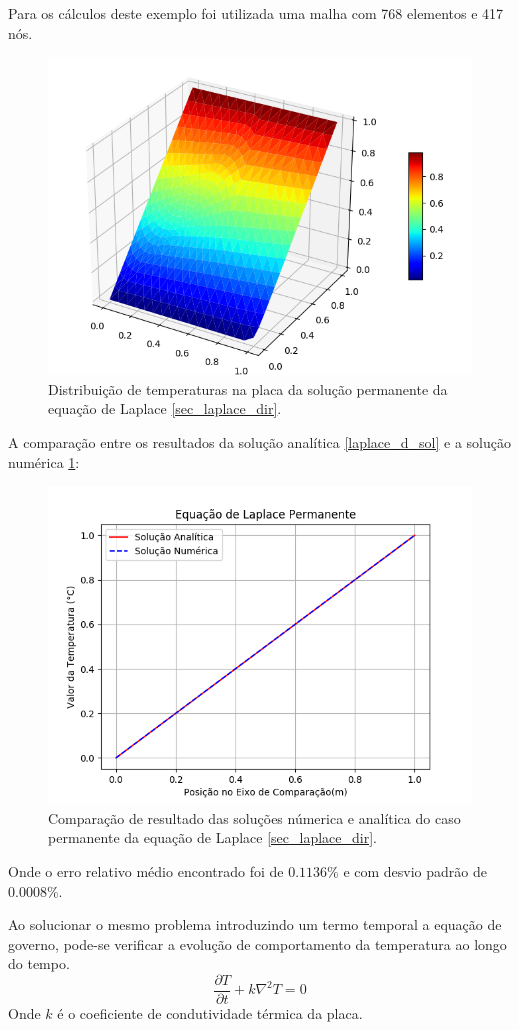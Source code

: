 Para os cálculos deste exemplo foi utilizada uma malha com 768 elementos e 417 nós.
\begin{figure}[H]
    \centering
    \includegraphics[width=.5\linewidth]{figures/laplace_dirichlet_permanent_3d.png}
    \caption{Distribuição de temperaturas na placa da solução permanente da equação de Laplace \ref{sec_laplace_dir}.}
    \label{laplace_d_3d}
\end{figure}

A comparação entre os resultados da solução analítica \ref{laplace_d_sol} e a solução numérica \ref{laplace_d_3d}:
\begin{figure}[H]
    \centering
    \includegraphics[width=.7\linewidth]{figures/laplace_dirichlet_permanent_comparison.png}
    \caption{Comparação de resultado das soluções númerica e analítica do caso permanente da equação de Laplace \ref{sec_laplace_dir}.}
    \label{laplace_d_perm_comp}
\end{figure}
Onde o erro relativo médio encontrado foi de $0.1136\%$ e com desvio padrão de $0.0008\%$.

Ao solucionar o mesmo problema introduzindo um termo temporal a equação de governo, pode-se verificar a evolução de comportamento da temperatura ao longo do tempo.
\begin{equation}
    \dfrac{\partial T}{\partial t} + k\nabla^2 T = 0
    \label{laplace_d_trans_eq} 
\end{equation}
Onde $k$ é o coeficiente de condutividade térmica da placa.

